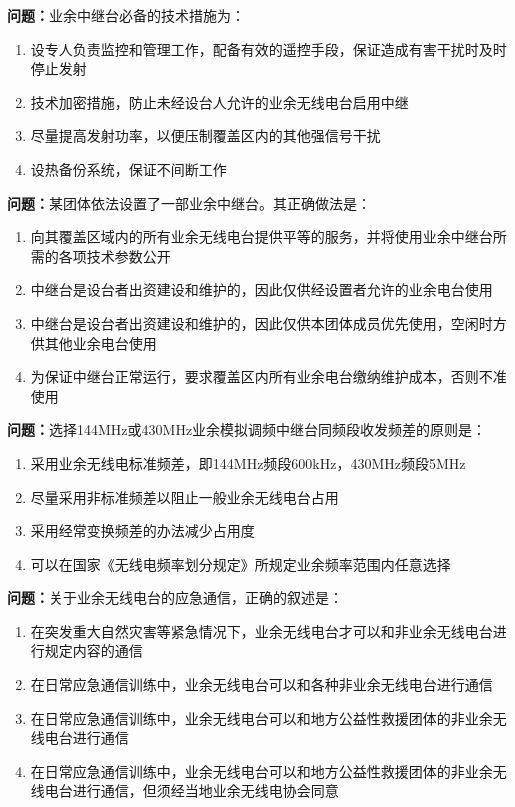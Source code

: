 \bigskip


\noindent\textbf{问题：}业余中继台必备的技术措施为：
\begin{enumerate}[label=\Alph*), leftmargin=3em]
\item 设专人负责监控和管理工作，配备有效的遥控手段，保证造成有害干扰时及时停止发射
\item 技术加密措施，防止未经设台人允许的业余无线电台启用中继
\item 尽量提高发射功率，以便压制覆盖区内的其他强信号干扰
\item 设热备份系统，保证不间断工作
\end{enumerate}

\bigskip


\noindent\textbf{问题：}某团体依法设置了一部业余中继台。其正确做法是：
\begin{enumerate}[label=\Alph*), leftmargin=3em]
\item 向其覆盖区域内的所有业余无线电台提供平等的服务，并将使用业余中继台所需的各项技术参数公开
\item 中继台是设台者出资建设和维护的，因此仅供经设置者允许的业余电台使用
\item 中继台是设台者出资建设和维护的，因此仅供本团体成员优先使用，空闲时方供其他业余电台使用
\item 为保证中继台正常运行，要求覆盖区内所有业余电台缴纳维护成本，否则不准使用
\end{enumerate}

\bigskip


\noindent\textbf{问题：}选择144MHz或430MHz业余模拟调频中继台同频段收发频差的原则是：
\begin{enumerate}[label=\Alph*), leftmargin=3em]
\item 采用业余无线电标准频差，即144MHz频段600kHz，430MHz频段5MHz
\item 尽量采用非标准频差以阻止一般业余无线电台占用
\item 采用经常变换频差的办法减少占用度
\item 可以在国家《无线电频率划分规定》所规定业余频率范围内任意选择
\end{enumerate}

\bigskip


\noindent\textbf{问题：}关于业余无线电台的应急通信，正确的叙述是：
\begin{enumerate}[label=\Alph*), leftmargin=3em]
\item 在突发重大自然灾害等紧急情况下，业余无线电台才可以和非业余无线电台进行规定内容的通信
\item 在日常应急通信训练中，业余无线电台可以和各种非业余无线电台进行通信
\item 在日常应急通信训练中，业余无线电台可以和地方公益性救援团体的非业余无线电台进行通信
\item 在日常应急通信训练中，业余无线电台可以和地方公益性救援团体的非业余无线电台进行通信，但须经当地业余无线电协会同意
\end{enumerate}


